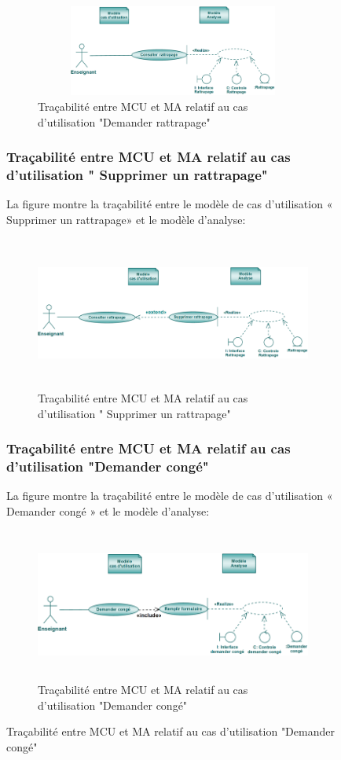 \documentclass[12 pt]{report}
\begin{document}
\begin{figure}[h]
\begin{center}
\begin{figure}[h]
\begin{center}
\includegraphics[width= 12cm , height =3cm]{tcr.PNG}
\caption{Traçabilité entre MCU et MA relatif au cas d’utilisation "Demander rattrapage"}
\end{center}
\end{figure} 

\subsubsection{Traçabilité entre MCU et MA relatif au cas d’utilisation " Supprimer un rattrapage" }
La figure  montre la traçabilité entre le modèle de cas d’utilisation « Supprimer un rattrapage» et le modèle d’analyse:

\begin{figure}[h]
\begin{center}
\includegraphics[width= 14cm , height =5cm]{tsr.PNG}
\caption{Traçabilité entre MCU et MA relatif au cas d’utilisation " Supprimer un rattrapage"}
\end{center}
\end{figure} 
\subsubsection{Traçabilité entre MCU et MA relatif au cas d’utilisation "Demander congé" }
La figure  montre la traçabilité entre le modèle de cas d’utilisation « Demander congé » et le modèle d’analyse:

\begin{figure}[h]
\begin{center}
\includegraphics[width= 14cm , height =5cm]{tdcc.PNG}
\caption{Traçabilité entre MCU et MA relatif au cas d’utilisation "Demander congé"}
\end{center}
\end{figure}

\end{center}
\end{figure}
\end{document}
